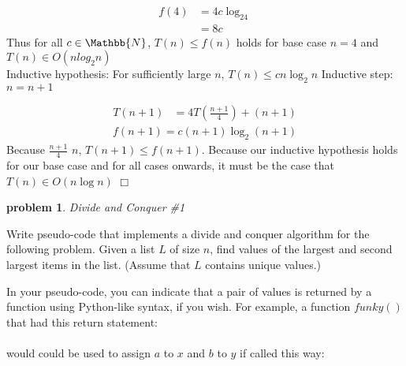\documentclass[10pt]{article}
\newenvironment{proof}{\par\noindent{\it Proof.}\hspace*{1em}}{$\Box$\bigskip}
\newtheorem{problem}{\sc\color{cit}problem}
\begin{document}
\begin{enumerate}
\begin{proof}
    	\begin{align*}
    	f(4) &= 4c\log_24   \\
    	&= 8c
    	\end{align*}
        Thus for all $c \in \Mathbb{N}$, $T(n) \leq f(n)$ holds for base case $n = 4$ and $T(n) \in O(nlog_2n)$ \\
        
        Inductive hypothesis: For sufficiently large $n$, $T(n) \leq cn\log_2n$
        Inductive step: $n = n + 1$
        
        \begin{align*}
            T(n + 1) &= 4T(\frac{n + 1}{4}) + (n + 1)
        \end{align*}
        \begin{align*}
            f(n + 1) = c(n + 1)\log_2(n + 1)
        \end{align*}
        Because $\frac{n+1}{4}$ \leq $n$, $T(n + 1) \leq f(n + 1)$. Because our inductive hypothesis holds for our base case and for all cases onwards, it must be the case that $T(n) \in O(n\log n)$
    	\end{proof}
    	
      \end{enumerate}   

 \begin{problem} Divide and Conquer \#1\end{problem}
    
\noindent
Write pseudo-code that implements a divide and conquer algorithm for the following problem.  Given a list $L$ of size $n$,  find values of the largest and second largest items in the list.  (Assume that $L$ contains unique values.)
	
	In your pseudo-code,  you can indicate that a pair of values is returned by a function using Python-like syntax, if you wish.  For example,  a function $funky()$ that had this return statement:\\
	\hspace*{3em}{\tt return a, b} \\
	would could be used to assign $a$ to $x$ and $b$ to $y$ if called this way: \\
	\hspace*{3em}{\tt (x, y) = funky()}
	
\end{document}
